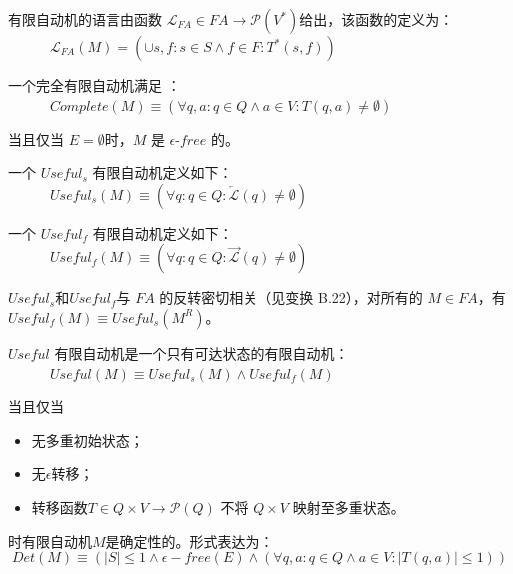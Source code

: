 \begin{definition}[$FA$的语言]
    有限自动机的语言由函数 $\mathcal{L}_{FA} \in FA \longrightarrow \mathcal{P}(V^*) $给出，该函数的定义为： \\
    \mbox{　　　}$ \mathcal{L}_{FA} (M) = (\cup s,f:s \in S \land f \in F : T^* (s,f)) $ 
\end{definition}

\begin{definition}
    一个完全有限自动机满足 ：\\
    \mbox{　　}　$ Complete(M) \equiv ( \forall q,a:q\in Q \land a \in V : T(q,a) \not= \emptyset )$
\end{definition}

\begin{definition}
    当且仅当 $E=\emptyset$时，$M$ 是 $\epsilon$-$free$ 的。
\end{definition}

\begin{definition}
    一个 $Useful_s$ 有限自动机定义如下： \\
    \mbox{　　}　$ Useful_s (M) \equiv ( \forall q:q \in Q : \overleftarrow{\mathcal{L}} (q) \not= \emptyset ) $
\end{definition}

\begin{definition}
    一个 $Useful_f$ 有限自动机定义如下： \\
    \mbox{　　}　$ Useful_f (M) \equiv ( \forall q:q \in Q : \overrightarrow{\mathcal{L}} (q) \not= \emptyset ) $
\end{definition}

\begin{remark}
    $Useful_s$和$Useful_f$与 $FA$ 的反转密切相关（见变换 B.22），对所有的 $M \in FA$，有 $Useful_f (M) \equiv Useful_s (M^R)$。
\end{remark}

\begin{definition}
    $Useful$ 有限自动机是一个只有可达状态的有限自动机：\\
    \mbox{　　}　$ Useful (M) \equiv Useful_s (M) \land Useful_f (M) $ 
\end{definition}

\begin{property}
    当且仅当
    \begin{itemize}
    \item  无多重初始状态；
    \item  无$\epsilon$转移；
    \item  转移函数$T \in Q \times V \longrightarrow \mathcal{P} (Q) $ 不将 $Q \times V$ 映射至多重状态。
\end{itemize}
时有限自动机$M$是确定性的。形式表达为：
$$ Det(M) \equiv ( |S| \leq 1 \land \epsilon-free(E) \land ( \forall q,a:q \in Q \land a \in V : |T(q,a)| \leq 1 )) $$
\end{property}

